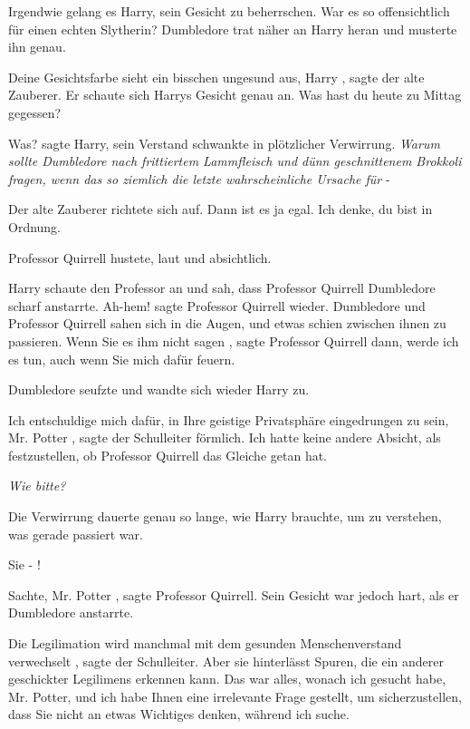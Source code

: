 Irgendwie gelang es Harry, sein Gesicht zu beherrschen. War es so offensichtlich
für einen echten Slytherin? Dumbledore trat näher an Harry heran und musterte
ihn genau.

\glqq Deine Gesichtsfarbe sieht ein bisschen ungesund aus, Harry\grqq{} , sagte
der alte Zauberer. Er schaute sich Harrys Gesicht genau an. \glqq Was hast du
heute zu Mittag gegessen?\grqq{}

\glqq Was?\grqq{} sagte Harry, sein Verstand schwankte in plötzlicher
Verwirrung. \emph{ Warum sollte Dumbledore nach frittiertem Lammfleisch und dünn
geschnittenem Brokkoli fragen, wenn das so ziemlich die letzte wahrscheinliche
Ursache für} -

Der alte Zauberer richtete sich auf. \glqq Dann ist es ja egal. Ich denke, du
bist in Ordnung.\grqq{}

Professor Quirrell hustete, laut und absichtlich.

Harry schaute den Professor an und sah, dass Professor Quirrell Dumbledore
scharf anstarrte. \glqq Ah-hem!\grqq{} sagte Professor Quirrell wieder.
Dumbledore und Professor Quirrell sahen sich in die Augen, und etwas schien
zwischen ihnen zu passieren. \glqq Wenn Sie es ihm nicht sagen\grqq{} , sagte
Professor Quirrell dann, \glqq werde ich es tun, auch wenn Sie mich dafür
feuern.\grqq{}

Dumbledore seufzte und wandte sich wieder Harry zu.

\glqq Ich entschuldige mich dafür, in Ihre geistige Privatsphäre eingedrungen zu
sein, Mr. Potter\grqq{} , sagte der Schulleiter förmlich. \glqq Ich hatte keine
andere Absicht, als festzustellen, ob Professor Quirrell das Gleiche getan
hat.\grqq{}

\emph{ Wie bitte? }

Die Verwirrung dauerte genau so lange, wie Harry brauchte, um zu verstehen, was
gerade passiert war.

\glqq Sie - !\grqq{}

\glqq Sachte, Mr. Potter\grqq{} , sagte Professor Quirrell. Sein Gesicht war
jedoch hart, als er Dumbledore anstarrte.

\glqq Die Legilimation wird manchmal mit dem gesunden Menschenverstand
verwechselt\grqq{} , sagte der Schulleiter. \glqq Aber sie hinterlässt Spuren,
die ein anderer geschickter Legilimens erkennen kann. Das war alles, wonach ich
gesucht habe, Mr. Potter, und ich habe Ihnen eine irrelevante Frage gestellt, um
sicherzustellen, dass Sie nicht an etwas Wichtiges denken, während ich
suche.\grqq{}

